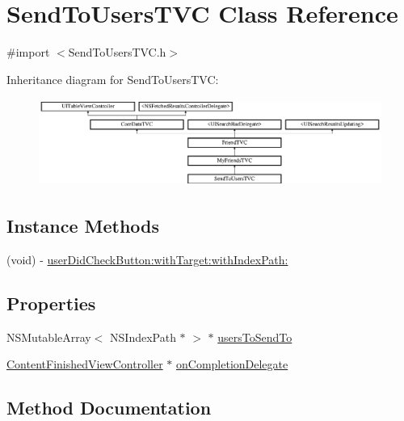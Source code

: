 \hypertarget{interface_send_to_users_t_v_c}{}\section{Send\+To\+Users\+T\+VC Class Reference}
\label{interface_send_to_users_t_v_c}


{\ttfamily \#import $<$Send\+To\+Users\+T\+V\+C.\+h$>$}

Inheritance diagram for Send\+To\+Users\+T\+VC\+:\begin{figure}[H]
\begin{center}
\leavevmode
\includegraphics[height=2.880659cm]{interface_send_to_users_t_v_c}
\end{center}
\end{figure}
\subsection*{Instance Methods}
\begin{DoxyCompactItemize}
\item 
(void) -\/ \hyperlink{interface_send_to_users_t_v_c_a6cd17eb779b4c125d7f271f4170a71c9}{user\+Did\+Check\+Button\+:with\+Target\+:with\+Index\+Path\+:}
\end{DoxyCompactItemize}
\subsection*{Properties}
\begin{DoxyCompactItemize}
\item 
N\+S\+Mutable\+Array$<$ N\+S\+Index\+Path $\ast$ $>$ $\ast$ \hyperlink{interface_send_to_users_t_v_c_a62d863a89cf9d45e9a9ae98724c69386}{users\+To\+Send\+To}
\item 
\hyperlink{interface_content_finished_view_controller}{Content\+Finished\+View\+Controller} $\ast$ \hyperlink{interface_send_to_users_t_v_c_a13d1910de12ac313b0455dfe96839d01}{on\+Completion\+Delegate}
\end{DoxyCompactItemize}


\subsection{Method Documentation}
\hypertarget{interface_send_to_users_t_v_c_a6cd17eb779b4c125d7f271f4170a71c9}{}\label{interface_send_to_users_t_v_c_a6cd17eb779b4c125d7f271f4170a71c9} 
